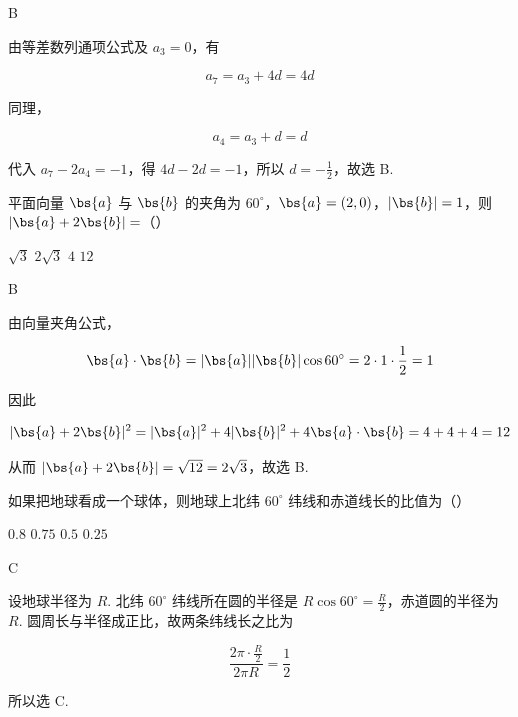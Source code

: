 \begin{answer}
B
\end{answer}

\begin{solution}
由等差数列通项公式及 \(a_3=0\)，有

\[
a_7=a_3+4d=4d
\]

同理，

\[
a_4=a_3+d=d
\]

代入 \(a_7-2a_4=-1\)，得 \(4d-2d=-1\)，所以 \(d=-\frac12\)，故选 B.
\end{solution}

\begin{problem}
平面向量 \(\bs{a}\) 与 \(\bs{b}\) 的夹角为 \( 60^{\circ} \)，\( \bs{a} = (2, 0) \)，\( |\bs{b}| = 1 \)，则 \( |\bs{a} + 2\bs{b}| = \)（\quad）

\choices
    {\(\sqrt{3}\)}
    {\(2 \sqrt{3}\)}
    {\(4\)}
    {\(12\)}
\end{problem}

\begin{answer}
B
\end{answer}

\begin{solution}
由向量夹角公式，

\[
\bs{a}\cdot\bs{b}=|\bs{a}||\bs{b}|\cos60^{\circ}=2\cdot1\cdot\frac12=1
\]

因此

\[
|\bs{a}+2\bs{b}|^2=|\bs{a}|^2+4|\bs{b}|^2+4\bs{a}\cdot\bs{b}
 =4+4+4=12
\]

从而 \( |\bs{a}+2\bs{b}|=\sqrt{12}=2\sqrt3\)，故选 B.
\end{solution}

\begin{problem}
如果把地球看成一个球体，则地球上北纬 \(60^{\circ}\) 纬线和赤道线长的比值为（\quad）

\choices
    {\(0.8\)}
    {\(0.75\)}
    {\(0.5\)}
    {\(0.25\)}
\end{problem}

\begin{answer}
C
\end{answer}

\begin{solution}
设地球半径为 \(R\). 北纬 \(60^{\circ}\) 纬线所在圆的半径是
\(R\cos60^{\circ}=\frac R2\)，赤道圆的半径为 \(R\). 圆周长与半径成正比，故两条纬线长之比为

\[
\frac{2\pi\cdot\frac R2}{2\pi R}=\frac12
\]

所以选 C.
\end{solution}


